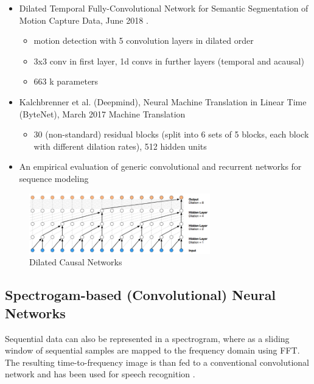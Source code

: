 \ifdefined\SHOWNOTES
\begin{itemize}
    \item Dilated Temporal Fully-Convolutional Network for Semantic Segmentation of Motion Capture Data, June 2018 \cite{cheema2018dilated}.
    \begin{itemize}
        \item motion detection with 5 convolution layers in dilated order
        \item 3x3 conv in first layer, 1d convs in further layers (temporal and acausal)
        \item 663 k parameters
    \end{itemize}
    \item Kalchbrenner et al. (Deepmind), Neural Machine Translation in Linear Time (ByteNet), March 2017
Machine Translation \cite{kalchbrenner2016neural}
    \begin{itemize}
        \item 30 (non-standard) residual blocks (split into 6 sets of 5 blocks, each block with different dilation rates), 512 hidden units
    \end{itemize}
    \item An empirical evaluation of generic convolutional and recurrent networks for sequence modeling
\cite{bai2018empirical}

\end{itemize}
\fi


\begin{figure}[ht]
    \centering
    \includegraphics[width=0.7\textwidth]{figures/dilated.png}
    \caption{Dilated Causal Networks \cite{cheema2018dilated}}
    \label{fig:dilated}
\end{figure}

\subsection{Spectrogam-based (Convolutional) Neural Networks}
Sequential data can also be represented in a spectrogram, where as a sliding window of sequential samples are mapped to the frequency domain using FFT. The resulting time-to-frequency image is than fed to a  conventional convolutional network and has been used for speech recognition \cite{abdel2012applying}.
\ifdefined\SHOWNOTES
